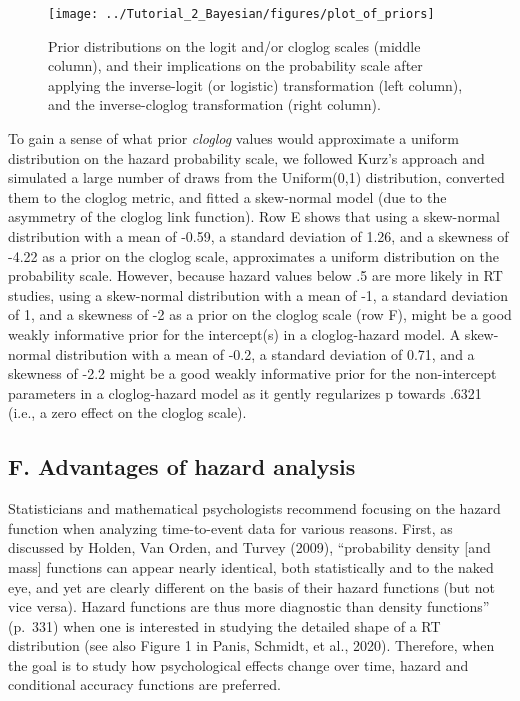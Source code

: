 \documentclass[
  man, donotrepeattitle,floatsintext]{apa6}
\begin{document}
\begin{figure}[H]

{\centering \texttt{[image: ../Tutorial\_2\_Bayesian/figures/plot\_of\_priors]} 

}

\caption{Prior distributions on the logit and/or cloglog scales (middle column), and their implications on the probability scale after applying the inverse-logit (or logistic) transformation (left column), and the inverse-cloglog transformation (right column).}\label{fig:plot-priors}
\end{figure}

To gain a sense of what prior \emph{cloglog} values would approximate a uniform distribution on the hazard probability scale, we followed Kurz's approach and simulated a large number of draws from the Uniform(0,1) distribution, converted them to the cloglog metric, and fitted a skew-normal model (due to the asymmetry of the cloglog link function). Row E shows that using a skew-normal distribution with a mean of -0.59, a standard deviation of 1.26, and a skewness of -4.22 as a prior on the cloglog scale, approximates a uniform distribution on the probability scale.
However, because hazard values below .5 are more likely in RT studies, using a skew-normal distribution with a mean of -1, a standard deviation of 1, and a skewness of -2 as a prior on the cloglog scale (row F), might be a good weakly informative prior for the intercept(s) in a cloglog-hazard model.
A skew-normal distribution with a mean of -0.2, a standard deviation of 0.71, and a skewness of -2.2 might be a good weakly informative prior for the non-intercept parameters in a cloglog-hazard model as it gently regularizes p towards .6321 (i.e., a zero effect on the cloglog scale).

\subsection{F. Advantages of hazard analysis}\label{f.-advantages-of-hazard-analysis}

Statisticians and mathematical psychologists recommend focusing on the hazard function when analyzing time-to-event data for various reasons. First, as discussed by Holden, Van Orden, and Turvey (2009), ``probability density {[}and mass{]} functions can appear nearly identical, both statistically and to the naked eye, and yet are clearly different on the basis of their hazard functions (but not vice versa). Hazard functions are thus more diagnostic than density functions'' (p.~331) when one is interested in studying the detailed shape of a RT distribution (see also Figure 1 in Panis, Schmidt, et al., 2020). Therefore, when the goal is to study how psychological effects change over time, hazard and conditional accuracy functions are preferred.
\end{document}
